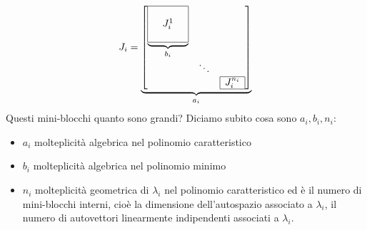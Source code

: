 \documentclass[10pt,a4paper]{book}
\begin{document}
\begin{equation*}
J_i =\underbrace{\begin{bmatrix}
\underbrace{\begin{array}{|c c c|}
\hline
 &  & \\
 & J^1_i & \\
 &  & \\
\hline
\end{array}}_{b_i} &  & \\
 & \ddots  & \\
 &  & \begin{array}{|c|}
\hline
J^{n_i}_i\\
\hline
\end{array}
\end{bmatrix}}_{a_i}
\end{equation*}
Questi mini-blocchi quanto sono grandi? Diciamo subito cosa sono $a_i ,b_i ,n_i$:
\begin{itemize}
\item $a_i$ molteplicità algebrica nel polinomio caratteristico
\item $b_i$ molteplicità algebrica nel polinomio minimo
\item $n_i$ molteplicità geometrica di $\lambda _i$ nel polinomio caratteristico ed è il numero di mini-blocchi interni, cioè la dimensione dell'autospazio associato a $\lambda _i$, il numero di autovettori linearmente indipendenti associati a $\lambda _i$.
\end{itemize}
\end{document}
